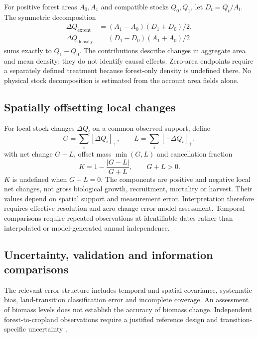 \documentclass[11pt,a4paper]{article}
\begin{document}
For positive forest areas $A_0,A_1$ and compatible stocks $Q_0,Q_1$, let $D_t=Q_t/A_t$. The symmetric decomposition
\begin{align}
\Delta Q_{\mathrm{extent}}&=(A_1-A_0)(D_1+D_0)/2,\label{eq:extent}\\
\Delta Q_{\mathrm{density}}&=(D_1-D_0)(A_1+A_0)/2\label{eq:density}
\end{align}
sums exactly to $Q_1-Q_0$. The contributions describe changes in aggregate area and mean density; they do not identify causal effects. Zero-area endpoints require a separately defined treatment because forest-only density is undefined there. No physical stock decomposition is estimated from the account area fields alone.

\subsection{Spatially offsetting local changes}
For local stock changes $\Delta Q_i$ on a common observed support, define
\[
G=\sum_i[\Delta Q_i]_+,\qquad L=\sum_i[-\Delta Q_i]_+,
\]
with net change $G-L$, offset mass $\min(G,L)$ and cancellation fraction
\begin{equation}
K=1-\frac{|G-L|}{G+L},\qquad G+L>0.\label{eq:cancel}
\end{equation}
$K$ is undefined when $G+L=0$. The components are positive and negative local net changes, not gross biological growth, recruitment, mortality or harvest. Their values depend on spatial support and measurement error. Interpretation therefore requires effective-resolution and zero-change error-model assessment. Temporal comparisons require repeated observations at identifiable dates rather than interpolated or model-generated annual independence.

\subsection{Uncertainty, validation and information comparisons}
The relevant error structure includes temporal and spatial covariance, systematic bias, land-transition classification error and incomplete coverage. An assessment of biomass levels does not establish the accuracy of biomass change. Independent forest-to-cropland observations require a justified reference design and transition-specific uncertainty \citep{Olofsson2014}.
\end{document}

